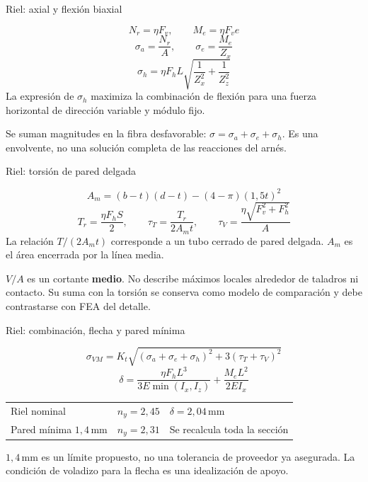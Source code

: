 \documentclass[10pt,aspectratio=169]{beamer}
\newcommand{\mm}{\,\mathrm{mm}}
\newcommand{\mcref}{Guía de diseño}
\begin{document}
\gdef\mcref{Mathcad: sección 6 / pág. 6-7}
\begin{frame}[t]{Riel: axial y flexión biaxial}

\[
N_r=\eta F_v,\qquad M_e=\eta F_ve
\]
\[
\sigma_a=\frac{N_r}{A},\qquad \sigma_e=\frac{M_e}{Z_x}
\]
\[
\sigma_h=\eta F_hL\sqrt{\frac1{Z_x^2}+\frac1{Z_z^2}}
\]
La expresión de $\sigma_h$ maximiza la combinación de flexión para una fuerza horizontal de dirección variable y módulo fijo.

Se suman magnitudes en la fibra desfavorable: $\sigma=\sigma_a+\sigma_e+\sigma_h$. Es una envolvente, no una solución completa de las reacciones del arnés.

\end{frame}

\gdef\mcref{Mathcad: sección 6 / pág. 6-7}
\begin{frame}[t]{Riel: torsión de pared delgada}

\[
A_m=(b-t)(d-t)-(4-\pi)(1{,}5t)^2
\]
\[
T_r=\frac{\eta F_hS}{2},\qquad
\tau_T=\frac{T_r}{2A_mt},\qquad
\tau_V=\frac{\eta\sqrt{F_v^2+F_h^2}}{A}
\]
La relación $T/(2A_mt)$ corresponde a un tubo cerrado de pared delgada. $A_m$ es el área encerrada por la línea media.

$V/A$ es un cortante \textbf{medio}. No describe máximos locales alrededor de taladros ni contacto. Su suma con la torsión se conserva como modelo de comparación y debe contrastarse con FEA del detalle.

\end{frame}

\gdef\mcref{Mathcad: sección 8 / pág. 9-10}
\begin{frame}[t]{Riel: combinación, flecha y pared mínima}

\[
\sigma_{VM}=K_t\sqrt{(\sigma_a+\sigma_e+\sigma_h)^2+3(\tau_T+\tau_V)^2}
\]
\[
\delta=\frac{\eta F_hL^3}{3E\min(I_x,I_z)}+\frac{M_eL^2}{2EI_x}
\]
\begin{center}\begin{tabular}{lll}\toprule
Riel nominal & $n_y=2{,}45$ & $\delta=2{,}04\mm$\\
Pared mínima $1{,}4\mm$ & $n_y=2{,}31$ & Se recalcula toda la sección\\\bottomrule\end{tabular}\end{center}
$1{,}4\mm$ es un límite propuesto, no una tolerancia de proveedor ya asegurada. La condición de voladizo para la flecha es una idealización de apoyo.

\end{frame}
\end{document}
